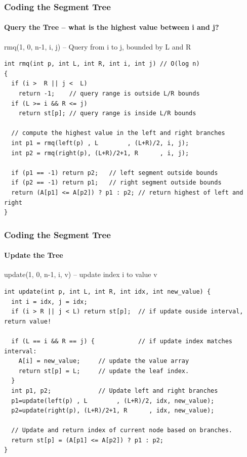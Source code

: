 \begin{frame}[fragile]
  \frametitle{Coding the Segment Tree}
  \framesubtitle{Query the Tree -- what is the highest value between i and j?}
{\smaller
\begin{block}{rmq(1, 0, n-1, i, j) -- Query from i to j, bounded by L and R}
\begin{verbatim}
int rmq(int p, int L, int R, int i, int j) // O(log n)
{
  if (i >  R || j <  L)
    return -1;    // query range is outside L/R bounds
  if (L >= i && R <= j)
    return st[p]; // query range is inside L/R bounds

  // compute the highest value in the left and right branches
  int p1 = rmq(left(p) , L        , (L+R)/2, i, j);
  int p2 = rmq(right(p), (L+R)/2+1, R      , i, j);

  if (p1 == -1) return p2;   // left segment outside bounds
  if (p2 == -1) return p1;   // right segment outside bounds
  return (A[p1] <= A[p2]) ? p1 : p2; // return highest of left and right
}
\end{verbatim}
\end{block}}
\end{frame}

\begin{frame}[fragile]
  \frametitle{Coding the Segment Tree}
  \framesubtitle{Update the Tree}

{\smaller
\begin{block}{update(1, 0, n-1, i, v) -- update index i to value v}
\begin{verbatim}
int update(int p, int L, int R, int idx, int new_value) {
  int i = idx, j = idx;
  if (i > R || j < L) return st[p];  // if update ouside interval, return value!

  if (L == i && R == j) {            // if update index matches interval:
    A[i] = new_value;     // update the value array
    return st[p] = L;     // update the leaf index.
  }
  int p1, p2;             // Update left and right branches
  p1=update(left(p) , L        , (L+R)/2, idx, new_value);
  p2=update(right(p), (L+R)/2+1, R      , idx, new_value);

  // Update and return index of current node based on branches.
  return st[p] = (A[p1] <= A[p2]) ? p1 : p2;
}
\end{verbatim}
\end{block}}
\end{frame}
